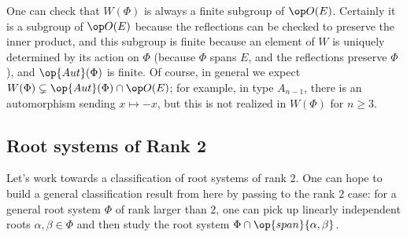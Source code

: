 \documentclass[../notes.tex]{subfiles}
\begin{document}
\begin{remark}
	One can check that $W(\Phi)$ is always a finite subgroup of $\op O(E)$. Certainly it is a subgroup of $\op O(E)$ because the reflections can be checked to preserve the inner product, and this subgroup is finite because an element of $W$ is uniquely determined by its action on $\Phi$ (because $\Phi$ spans $E$, and the reflections preserve $\Phi$), and $\op{Aut}(\Phi)$ is finite. Of course, in general we expect $W(\Phi)\subsetneq\op{Aut}(\Phi)\cap\op O(E)$; for example, in type $A_{n-1}$, there is an automorphism sending $x\mapsto-x$, but this is not realized in $W(\Phi)$ for $n\ge3$.
\end{remark}

\subsection{Root systems of Rank 2}
Let's work towards a classification of root systems of rank $2$. One can hope to build a general classification result from here by passing to the rank $2$ case: for a general root system $\Phi$ of rank larger than $2$, one can pick up linearly independent roots $\alpha,\beta\in\Phi$ and then study the root system $\Phi\cap\op{span}\{\alpha,\beta\}$.
\end{document}
